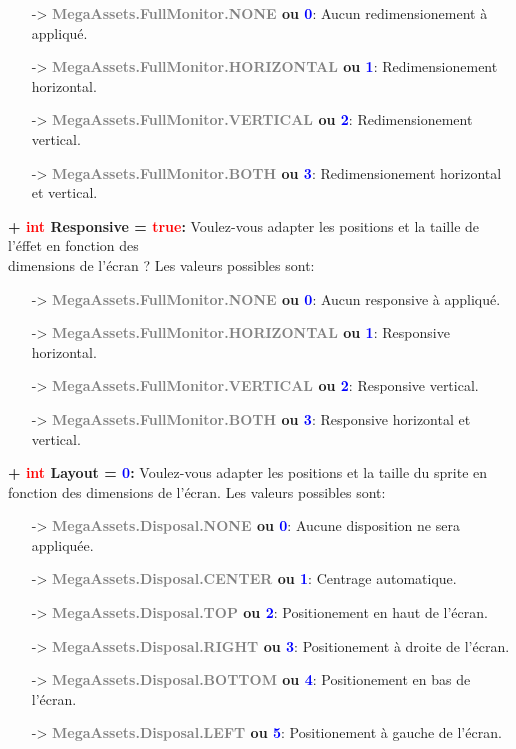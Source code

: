 \documentclass[a4paper, 11pt]{article}
\begin{document}
	\begin{itemize}
		\item [-> \textbf{\textcolor{gray}{MegaAssets.FullMonitor.NONE} ou \textcolor{blue}{0}}:] Aucun 
		redimensionement à appliqué.
		\item [-> \textbf{\textcolor{gray}{MegaAssets.FullMonitor.HORIZONTAL} ou \textcolor{blue}{1}}:] 
		Redimensionement horizontal.
		\item [-> \textbf{\textcolor{gray}{MegaAssets.FullMonitor.VERTICAL} ou \textcolor{blue}{2}}:] 
		Redimensionement vertical.
		\item [-> \textbf{\textcolor{gray}{MegaAssets.FullMonitor.BOTH} ou \textcolor{blue}{3}}:] 
		Redimensionement horizontal et vertical.\\
	\end{itemize}
	\textbf{+ \textcolor{red}{int} Responsive = \textcolor{red}{true}:} Voulez-vous adapter les positions et 
	la taille de l'éffet en fonction des \\dimensions de l'écran ? Les valeurs possibles sont:
	\begin{itemize}
		\item [-> \textbf{\textcolor{gray}{MegaAssets.FullMonitor.NONE} ou \textcolor{blue}{0}}:] Aucun 
		responsive à appliqué.
		\item [-> \textbf{\textcolor{gray}{MegaAssets.FullMonitor.HORIZONTAL} ou \textcolor{blue}{1}}:] 
		Responsive horizontal.
		\item [-> \textbf{\textcolor{gray}{MegaAssets.FullMonitor.VERTICAL} ou \textcolor{blue}{2}}:] 
		Responsive vertical.
		\item [-> \textbf{\textcolor{gray}{MegaAssets.FullMonitor.BOTH} ou \textcolor{blue}{3}}:] Responsive 
		horizontal et vertical.\\
	\end{itemize}
	\textbf{+ \textcolor{red}{int} Layout = \textcolor{blue}{0}:} Voulez-vous adapter les positions et 
	la taille du sprite en fonction des dimensions de l'écran. Les valeurs possibles sont:
	\begin{itemize}
		\item [-> \textbf{\textcolor{gray}{MegaAssets.Disposal.NONE} ou \textcolor{blue}{0}}:] Aucune 
		disposition ne sera appliquée.
		\item [-> \textbf{\textcolor{gray}{MegaAssets.Disposal.CENTER} ou \textcolor{blue}{1}}:] Centrage 
		automatique.
		\item [-> \textbf{\textcolor{gray}{MegaAssets.Disposal.TOP} ou \textcolor{blue}{2}}:] Positionement
		en haut de l'écran.
		\item [-> \textbf{\textcolor{gray}{MegaAssets.Disposal.RIGHT} ou \textcolor{blue}{3}}:]
		Positionement à droite de l'écran.
		\item [-> \textbf{\textcolor{gray}{MegaAssets.Disposal.BOTTOM} ou \textcolor{blue}{4}}:]
		Positionement en bas de l'écran.
		\item [-> \textbf{\textcolor{gray}{MegaAssets.Disposal.LEFT} ou \textcolor{blue}{5}}:] Positionement
		à gauche de l'écran.\\
	\end{itemize}
\end{document}
